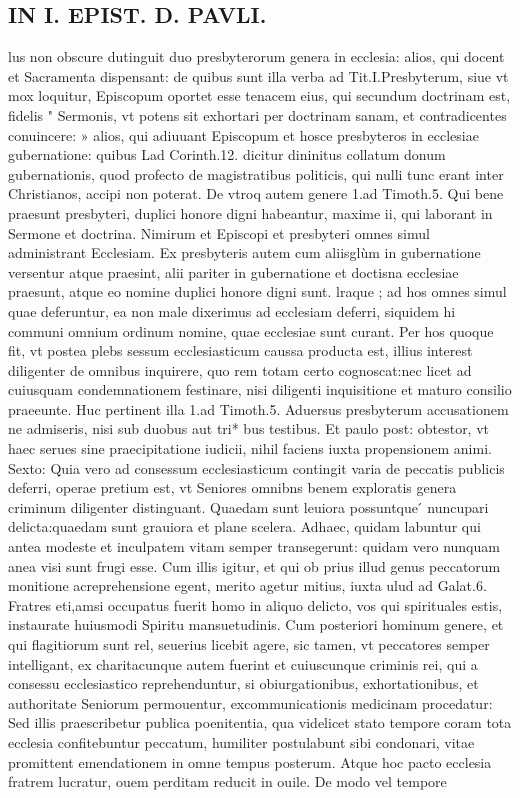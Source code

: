 \documentclass{article}
\begin{document}
\begin{pages}
\section*{IN I. EPIST. D. PAVLI. }
\marginpar{[ p.67 ]}
\marginpar{[ p.68 ]}
\marginpar{[ p.69 ]}
\marginpar{[ p.70 ]}\pstart lus non obscure dutinguit duo presbyterorum genera in ecclesia: alios, qui docent et Sacramenta dispensant: de quibus sunt illa verba ad Tit.I.Presbyterum, siue vt mox loquitur, Episcopum oportet esse tenacem eius, qui secundum doctrinam est, fidelis " Sermonis, vt potens sit exhortari per doctrinam sanam, et contradicentes conuincere: » alios, qui adiuuant Episcopum et hosce presbyteros in ecclesiae gubernatione: quibus Lad Corinth.12. dicitur dininitus collatum donum gubernationis, quod profecto de magistratibus politicis, qui nulli tunc erant inter Christianos, accipi non poterat. De vtroq autem genere 1.ad Timoth.5. Qui bene praesunt presbyteri, duplici honore digni habeantur, maxime ii, qui laborant in Sermone et doctrina. Nimirum et Episcopi et presbyteri omnes simul administrant Ecclesiam. Ex presbyteris autem cum aliisglùm in gubernatione versentur atque  praesint, alii pariter in gubernatione et doctisna ecclesiae praesunt, atque  eo nomine duplici honore digni sunt. lraque ; ad hos omnes simul quae deferuntur, ea non male dixerimus ad ecclesiam deferri, siquidem hi communi omnium ordinum nomine, quae ecclesiae sunt curant. Per hos quoque  fit, vt postea plebs sessum ecclesiasticum caussa producta est, illius interest diligenter de omnibus inquirere, quo rem totam certo cognoscat:nec licet ad cuiusquam condemnationem festinare, nisi diligenti inquisitione et maturo consilio praeeunte. Huc pertinent illa 1.ad   Timoth.5. Aduersus presbyterum accusationem ne admiseris, nisi sub duobus aut tri* bus testibus. Et paulo post: obtestor, vt haec serues sine praecipitatione iudicii, nihil faciens iuxta propensionem animi. Sexto: Quia vero ad consessum ecclesiasticum contingit varia de peccatis publicis deferri, operae pretium est, vt Seniores omnibns benem exploratis genera criminum diligenter distinguant. Quaedam sunt leuiora possuntque ́ nuncupari delicta:quaedam sunt grauiora et plane scelera. Adhaec, quidam labuntur qui antea modeste et inculpatem vitam semper transegerunt: quidam vero nunquam anea visi sunt frugi esse. Cum illis igitur, et qui ob prius illud genus peccatorum monitione acreprehensione egent, merito agetur mitius, iuxta ulud ad Galat.6. Fratres eti,amsi occupatus fuerit homo in aliquo delicto, vos qui spirituales estis, instaurate huiusmodi Spiritu mansuetudinis. Cum posteriori hominum genere, et qui flagitiorum sunt rel, seuerius licebit agere, sic tamen, vt peccatores semper intelligant, ex charitacunque  autem fuerint et cuiuscunque  criminis rei, qui a consessu ecclesiastico reprehenduntur, si obiurgationibus, exhortationibus, et authoritate Seniorum permouentur, excommunicationis medicinam procedatur: Sed illis praescribetur publica poenitentia, qua videlicet stato tempore coram tota ecclesia confitebuntur peccatum, humiliter postulabunt sibi condonari, vitae promittent emendationem in omne tempus posterum. Atque  hoc pacto ecclesia fratrem lucratur, ouem perditam reducit in ouile. De modo vel tempore 
\end{pages}
\end{document}
